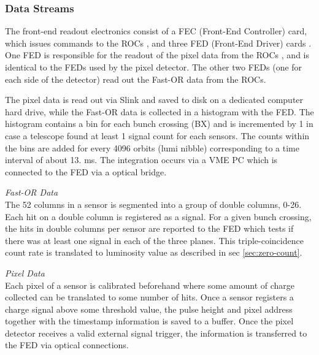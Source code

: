 


\subsubsection {Data Streams}

The front-end readout electronics consist of a FEC (Front-End Controller) card, which issues 
commands to the ROCs \cite{Allkofer:2007ek}, and three FED (Front-End Driver) cards \cite{Pernicka:1091743}. One FED is responsible for the readout of the pixel data from the ROCs , and is identical to the FEDs used by the pixel detector. The other two FEDs (one for each side of the detector) read out the Fast-OR data from the ROCs. 

The pixel data \cite{Barbero:467141} is read out via Slink and saved to disk on a dedicated computer hard drive, while the Fast-OR data is collected in a histogram with the FED. The histogram contains a bin for each bunch crossing (BX) and is incremented by 1 in case a telescope found at least 1 signal count for each sensors. The counts within the bins are added for every 4096 orbits (lumi nibble) corresponding to a time interval of about 13. ms. The integration occurs via a VME PC which is connected to the FED via a optical bridge.



\noindent
\textit{Fast-OR Data} \\
The 52 columns in a sensor is segmented into a group of double columns, 0-26. Each hit on a double column is registered as a signal. For a given bunch crossing, the hits in double columns per sensor are reported to the FED which tests if there was at least one signal in each of the three planes. This triple-coincidence count rate is translated to luminosity value as described in sec \ref{sec:zero-count}.


\noindent
\textit{Pixel Data} \\
Each pixel of a sensor is calibrated beforehand where some amount of charge collected can be translated to some number of hits. Once a sensor registers a charge signal above some threshold value, the pulse height and pixel address together with the timestamp information is saved to a buffer. Once the pixel detector receives a valid external signal trigger, the information is transferred to the FED via optical connections. 


